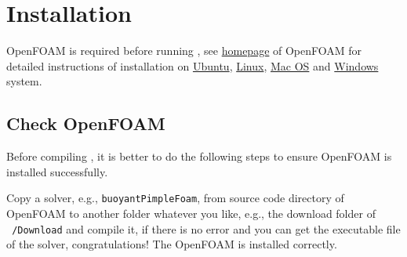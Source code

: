 \section{Installation}
\label{sec:installation}
OpenFOAM is required before running \foam, 
see \href{https://openfoam.org}{homepage} of OpenFOAM for detailed instructions of installation on 
\href{https://openfoam.org/download/7-ubuntu/}{Ubuntu},
\href{https://openfoam.org/download/7-linux/}{Linux},
\href{https://openfoam.org/download/7-macos/}{Mac OS}
and 
\href{https://openfoam.org/download/windows/}{Windows}
system.

\subsection{Check OpenFOAM}
Before compiling \foam, it is better to do the following steps to ensure OpenFOAM is installed successfully.

Copy a solver, e.g., \texttt{buoyantPimpleFoam}, from source code directory of OpenFOAM to another folder whatever you like, e.g., the download folder of \texttt{~/Download} and compile it, if there is no error and you can get the executable file of the solver, congratulations! The OpenFOAM is installed correctly.


